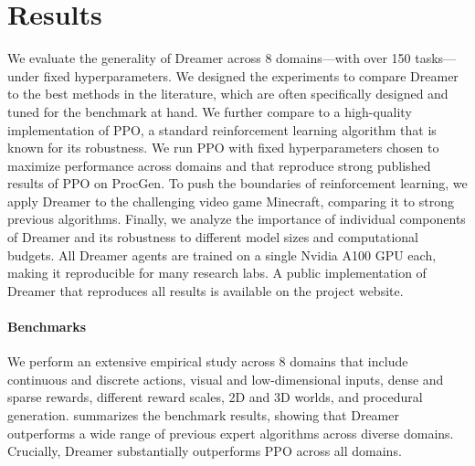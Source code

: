 


\section*{Results}
\label{sec:experiments}

We evaluate the generality of Dreamer across 8 domains---with over 150 tasks---under fixed hyperparameters.
We designed the experiments to compare Dreamer to the best methods in the literature, which are often specifically designed and tuned for the benchmark at hand.
We further compare to a high-quality implementation of PPO\citep{schulman2017ppo}, a standard reinforcement learning algorithm that is known for its robustness. We run PPO with fixed hyperparameters chosen to maximize performance across domains and that reproduce strong published results of PPO on ProcGen\citep{cobbe2021ppg}.
To push the boundaries of reinforcement learning, we apply Dreamer to the challenging video game Minecraft, comparing it to strong previous algorithms.
Finally, we analyze the importance of individual components of Dreamer and its robustness to different model sizes and computational budgets.
All Dreamer agents are trained on a single Nvidia A100 GPU each, making it reproducible for many research labs.
A public implementation of Dreamer that reproduces all results is available on the project website.

\paragraph{Benchmarks}
We perform an extensive empirical study across 8 domains that include continuous and discrete actions, visual and low-dimensional inputs, dense and sparse rewards, different reward scales, 2D and 3D worlds, and procedural generation.
 summarizes the benchmark results, showing that Dreamer outperforms a wide range of previous expert algorithms across diverse domains. Crucially, Dreamer substantially outperforms PPO across all domains.

